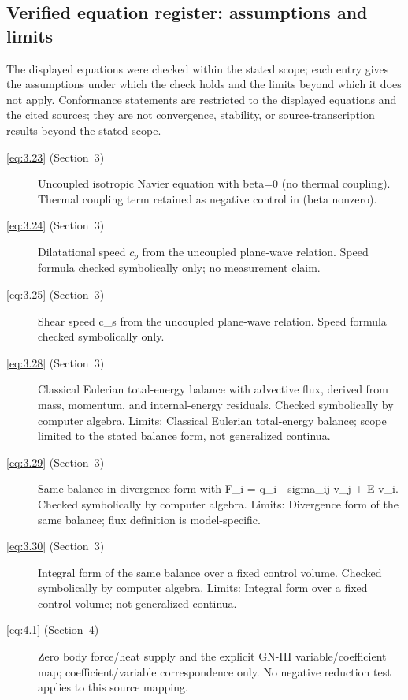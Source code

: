 \subsection{Verified equation register: assumptions and limits}
\label{sec:12.verified_register}

The displayed equations were checked within the stated scope; each entry gives the
assumptions under which the check holds and the limits beyond which it does not apply.
Conformance statements are restricted to the displayed equations and the cited sources;
they are not convergence, stability, or source-transcription results beyond the stated scope.

\begin{description}

  \item[\eqref{eq:3.23} (Section~3)] Uncoupled isotropic Navier equation with beta=0 (no thermal coupling). Thermal coupling term retained as negative control in (beta nonzero).

  \item[\eqref{eq:3.24} (Section~3)] Dilatational speed $c_p$ from the uncoupled plane-wave relation. Speed formula checked symbolically only; no measurement claim.

  \item[\eqref{eq:3.25} (Section~3)] Shear speed c\_s from the uncoupled plane-wave relation. Speed formula checked symbolically only.

  \item[\eqref{eq:3.28} (Section~3)] Classical Eulerian total-energy balance with advective flux, derived from mass, momentum, and internal-energy residuals. Checked symbolically by computer algebra. Limits: Classical Eulerian total-energy balance; scope limited to the stated balance form, not generalized continua.

  \item[\eqref{eq:3.29} (Section~3)] Same balance in divergence form with F\_i = q\_i - sigma\_ij v\_j + E v\_i. Checked symbolically by computer algebra. Limits: Divergence form of the same balance; flux definition is model-specific.

  \item[\eqref{eq:3.30} (Section~3)] Integral form of the same balance over a fixed control volume. Checked symbolically by computer algebra. Limits: Integral form over a fixed control volume; not generalized continua.

  \item[\eqref{eq:4.1} (Section~4)] Zero body force/heat supply and the explicit GN-III variable/coefficient map; coefficient/variable correspondence only. No negative reduction test applies to this source mapping.


\end{description}
